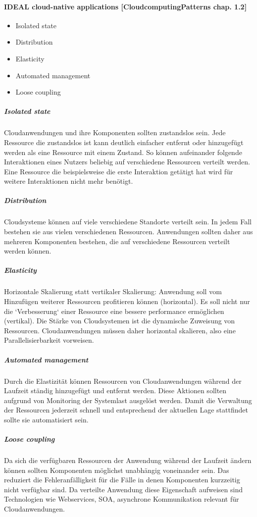 \documentclass[a4paper,10pt]{article}
\begin{document}
\paragraph{IDEAL cloud-native applications [CloudcomputingPatterns chap. 1.2]}

\begin{itemize}
 \item Isolated state
 \item Distribution
 \item Elasticity
 \item Automated management
 \item Loose coupling
\end{itemize}

\subparagraph{Isolated state}
Cloudanwendungen und ihre Komponenten sollten zustandslos sein.
Jede Ressource die zustandslos ist kann deutlich einfacher entfernt oder hinzugefügt werden als eine Ressource mit einem Zustand.
So können aufeinander folgende Interaktionen eines Nutzers beliebig auf verschiedene Ressourcen verteilt werden.
Eine Ressource die beispielsweise die erste Interaktion getätigt hat wird für weitere Interaktionen nicht mehr benötigt.
\subparagraph{Distribution}
Cloudsysteme können auf viele verschiedene Standorte verteilt sein.
In jedem Fall bestehen sie aus vielen verschiedenen Ressourcen.
Anwendungen sollten daher aus mehreren Komponenten bestehen, die auf verschiedene Ressourcen verteilt werden können.
\subparagraph{Elasticity}
Horizontale Skalierung statt vertikaler Skalierung:
Anwendung soll vom Hinzufügen weiterer Ressourcen profitieren können (horizontal).
Es soll nicht nur die `Verbesserung` einer Ressource eine bessere performance ermöglichen (vertikal).
Die Stärke von Cloudsystemen ist die dynamische Zuweisung von Ressourcen.
Cloudanwendungen müssen daher horizontal skalieren, also eine Parallelisierbarkeit vorweisen.
\subparagraph{Automated management}
Durch die Elastizität können Ressourcen von Cloudanwendungen während der Laufzeit ständig hinzugefügt und entfernt werden.
Diese Aktionen sollten aufgrund von Monitoring der Systemlast ausgelöst werden.
Damit die Verwaltung der Ressourcen jederzeit schnell und entsprechend der aktuellen Lage stattfindet sollte sie automatisiert sein.
\subparagraph{Loose coupling}
Da sich die verfügbaren Ressourcen der Anwendung während der Laufzeit ändern können sollten Komponenten möglichst unabhängig voneinander sein.
Das reduziert die Fehleranfälligkeit für die Fälle in denen Komponenten kurzzeitig nicht verfügbar sind. 
Da verteilte Anwendung diese Eigenschaft aufweisen sind Technologien wie Webservices, SOA, asynchrone Kommunikation relevant für Cloudanwendungen. 
\end{document}
